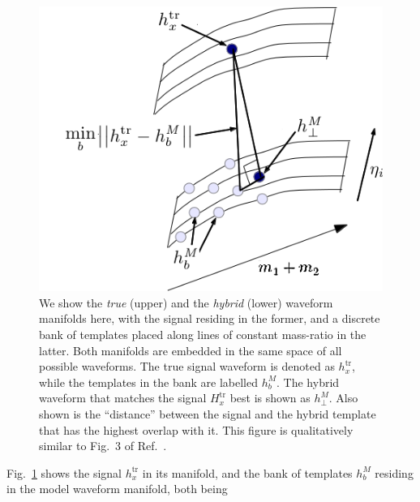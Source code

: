 \documentclass[aps,
prd,
twocolumn,
superscriptaddress,
lengthcheck,showpacs,letterpaper,nofootinbib,
floatfix]{revtex4-1}
\newcommand{\M}{\mathit{M}}
\newcommand{\tr}{\mathrm{tr}}
\begin{document}
\begin{figure}
 \centering
\includegraphics[width=\columnwidth]{Eff1v2.png}%
\caption{We show the \textit{true} (upper) and the \textit{hybrid} (lower) 
waveform manifolds here, with the signal residing in the former, and a discrete
bank of templates placed along lines of constant mass-ratio in the latter. 
Both manifolds are embedded in the same space of all possible waveforms.
The true signal waveform is denoted as $h^{\tr}_x$, while the templates in the
bank are labelled $h^{\M}_b$. The hybrid waveform that matches the signal $H^{\tr}_x$
best is shown as $h^{\M}_\perp$. Also shown is the ``distance'' between
the signal and the hybrid template that has the highest overlap with it.
This figure is qualitatively similar to Fig.~3 of
Ref.~\cite{WaveformAccuracy2008}.}
\label{fig:EFFdiag1}
\end{figure}
Fig.~\ref{fig:EFFdiag1} shows the signal $h^\tr_x$ in its manifold, and the
bank of templates $h^\M_b$ residing in the model waveform manifold, both being
\end{document}
